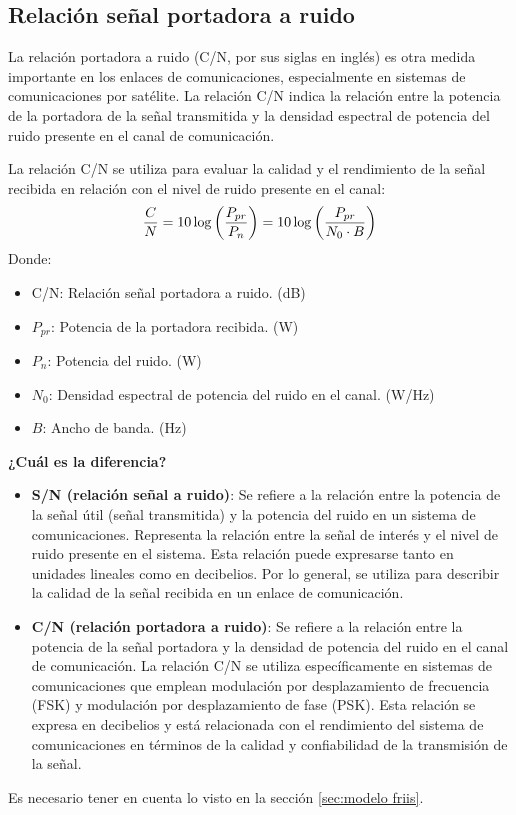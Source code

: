 \documentclass[
	12pt, %
	fleqn, %
	a4paper, %
	oneside, %
]{LegrandOrangeBook}
\begin{document}
\subsection{Relación señal portadora a ruido}
La relación portadora a ruido (C/N, por sus siglas en inglés) es otra medida importante en los enlaces de comunicaciones, especialmente en sistemas de comunicaciones por satélite. La relación C/N indica la relación entre la potencia de la portadora de la señal transmitida y la densidad espectral de potencia del ruido presente en el canal de comunicación.
\begin{definition}
La relación C/N se utiliza para evaluar la calidad y el rendimiento de la señal recibida en relación con el nivel de ruido presente en el canal:
\begin{equation}
\frac{C}{N}=10\log\left(\frac{P_{pr}}{P_n}\right)=10\log\left(\frac{P_{pr}}{N_0\cdot B}\right)
\end{equation}
Donde:
\begin{itemize}
\item C/N: Relación señal portadora a ruido. (dB)
\item $P_{pr}$: Potencia de la portadora recibida. (W)
\item $P_n$: Potencia del ruido. (W)
\item $N_0$: Densidad espectral de potencia del ruido en el canal. (W/Hz)
\item $B$: Ancho de banda. (Hz)
\end{itemize}
\end{definition}
\textbf{¿Cuál es la diferencia?}
\begin{itemize}
\item \textbf{S/N (relación señal a ruido)}: Se refiere a la relación entre la potencia de la señal útil (señal transmitida) y la potencia del ruido en un sistema de comunicaciones. Representa la relación entre la señal de interés y el nivel de ruido presente en el sistema. Esta relación puede expresarse tanto en unidades lineales como en decibelios. Por lo general, se utiliza para describir la calidad de la señal recibida en un enlace de comunicación.
\item \textbf{C/N (relación portadora a ruido)}: Se refiere a la relación entre la potencia de la señal portadora y la densidad de potencia del ruido en el canal de comunicación. La relación C/N se utiliza específicamente en sistemas de comunicaciones que emplean modulación por desplazamiento de frecuencia (FSK) y modulación por desplazamiento de fase (PSK). Esta relación se expresa en decibelios y está relacionada con el rendimiento del sistema de comunicaciones en términos de la calidad y confiabilidad de la transmisión de la señal.
\end{itemize}
Es necesario tener en cuenta lo visto en la sección \ref{sec:modelo friis}.
\end{document}
